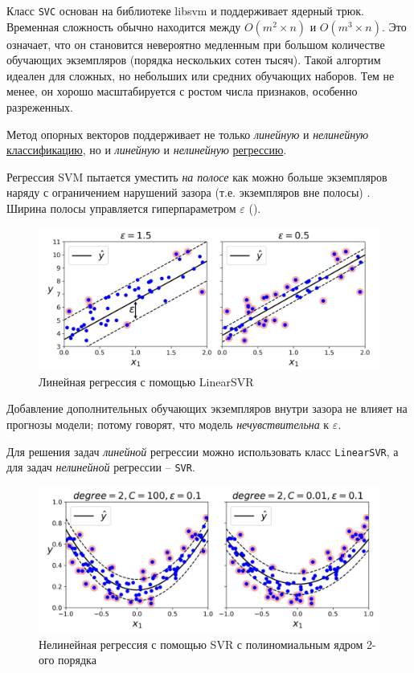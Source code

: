 \documentclass[%
	11pt,
	a4paper,
	utf8,
		]{article}
\begin{document}
Класс \verb|SVC| основан на библиотеке libsvm и поддерживает ядерный трюк. Временная сложность обычно находится между $ O(m^2 \times n) $ и $ O(m^3 \times n) $. Это означает, что он становится невероятно медленным при большом количестве обучающих экземпляров (порядка нескольких сотен тысяч). Такой алгортим идеален для сложных, но небольших или средних обучающих наборов. Тем не менее, он хорошо масштабируется с ростом числа признаков, особенно разреженных.

Метод опорных векторов поддерживает не только \emph{линейную} и \emph{нелинейную} \underline{классификацию}, но и \emph{линейную} и \emph{нелинейную} \underline{регрессию}.

Регрессия SVM пытается уместить \emph{на полосе} как можно больше экземпляров наряду с ограничением нарушений зазора (т.е. экземпляров вне полосы) \cite[]{geron:hands_on_ml}. Ширина полосы управляется гиперпараметром $ \varepsilon $ ().

\begin{figure}[h]
	\centering
	\includegraphics[scale=0.7]{figures/svm_linreg.png}
	\caption{ Линейная регрессия с помощью LinearSVR }\label{fig:svm_linreg}
\end{figure}

Добавление дополнительных обучающих экземпляров внутри зазора не влияет на прогнозы модели; потому говорят, что модель \emph{нечувствительна} к $ \varepsilon $.

Для решения задач \emph{линейной} регрессии можно использовать класс \verb|LinearSVR|, а для задач \emph{нелинейной} регрессии -- \verb|SVR|.

\begin{figure}[h]
	\centering
	\includegraphics[scale=0.7]{figures/svm_nonlinreg.png}
	\caption{ Нелинейная регрессия с помощью SVR с полиномиальным ядром 2-ого порядка }\label{fig:svm_nonlinreg}
\end{figure}
\end{document}
